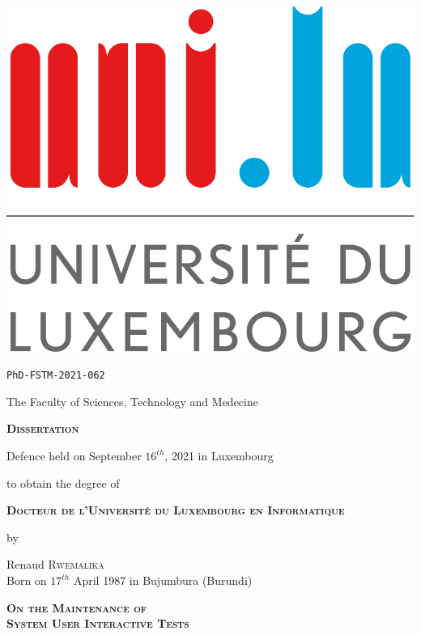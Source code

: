 \thispagestyle{empty}

\begin{center}         
         \includegraphics[width=0.2\linewidth]{figures/logo/logoul.pdf}
         \vspace{0.3cm}\noindent
        
        \texttt{PhD-FSTM-2021-062}
        
         The Faculty of Sciences, Technology and Medecine
         
         \vspace{1cm}\noindent
         {\LARGE \textbf{\textsc{Dissertation}}}
         
         \vspace{0.5cm}
         \noindent
         Defence held on September $16^{th}$, 2021 in Luxembourg
         
         \vspace{0.5cm}\noindent
         to obtain the degree of
         
         \vspace{0.8cm}\noindent
         {\large \textbf{\textsc{Docteur de l'Université du Luxembourg en Informatique}}}

         \vspace{0.5cm}\noindent
         {\Large by}

         \vspace{0.5cm}\noindent
         {\Large Renaud \textsc{Rwemalika}}\\
         {\footnotesize Born on $17^{th}$ April 1987 in Bujumbura (Burundi)}

         \vspace{1cm}\noindent
         {\LARGE \textbf{\textsc{On the Maintenance of}}}\\[0.4cm] 
         {\LARGE \textbf{\textsc{System User Interactive Tests}}}\\[0.4cm]
\end{center}

\vspace{4cm}

